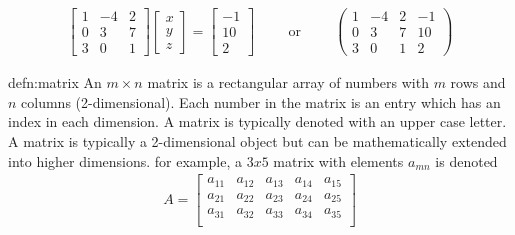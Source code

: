 \begin{align}
\begin{bmatrix}
1 & -4 & 2 \\
0 & 3 & 7 \\
3 & 0 & 1
\end{bmatrix}
\begin{bmatrix}
x \\
y \\
z
\end{bmatrix}
=
\begin{bmatrix}
-1 \\
10 \\
2
\end{bmatrix} 
\hspace{1cm} \text{or} \hspace{1cm} 
\left(
\begin{array}{ccc|c}
1 & -4 & 2 & -1 \\
0 & 3 & 7 & 10\\
3 & 0 & 1 & 2
\end{array}
\right)
\end{align}



\begin{defn}[Matrix]{defn:matrix}
	An $m\times n$ matrix is a rectangular array of numbers with $m$ rows and $n$ columns (2-dimensional). Each number in the matrix is an entry which has an index in each dimension. A matrix is typically denoted with an upper case letter. A matrix is typically a 2-dimensional object but can be mathematically extended into higher dimensions. for example, a $3x5$ matrix with elements $a_{mn}$ is denoted
	\begin{align}
	A = 
	\begin{bmatrix}
	a_{11} & a_{12} & a_{13} & a_{14} & a_{15} \\
	a_{21} & a_{22} & a_{23} & a_{24} & a_{25} \\
	a_{31} & a_{32} & a_{33} & a_{34} & a_{35} \\
	\end{bmatrix}
	\end{align}
\end{defn}

